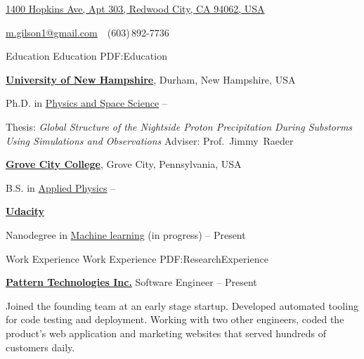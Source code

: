 \documentclass[letterpaper,MMMyyyy,nonstopmode]{simpleresumecv}
\newcommand{\CVAuthor}{Matthew Gilson, Ph.D}
\begin{document}

\Title{\CVAuthor}

\begin{SubTitle}
\href{https://www.google.com/maps/place/1400+Hopkins+Avenue,+Redwood+City,+California+994062,+USA}
{1400 Hopkins Ave, Apt 303, Redwood City, CA 94062, USA}
\par
\href{mailto:m.gilson1@gmail.com}
{m.gilson1@gmail.com}
\,\SubBulletSymbol\,
(603)\,892-7736
\end{SubTitle}

\begin{Body}


\Section
{Education}
{Education}
{PDF:Education}

\Entry
\href{http://www.unh.edu/}
{\textbf{University of New Hampshire}},
Durham, New Hampshire, USA

\Gap
\BulletItem
Ph.D. in
\href{http://physics.unh.edu/content/physics-phd}
{Physics and Space Science}
\hfill
{} --
\begin{Detail}
\SubBulletItem
Thesis: \textit{Global Structure of the Nightside Proton Precipitation During Substorms Using Simulations and Observations}
\SubBulletItem
Adviser:
Prof.~Jimmy~Raeder
\end{Detail}

\BigGap
\Entry
\href{http://www.gcc.edu/Pages/Grove-City-College.aspx}
{\textbf{Grove City College}},
Grove City, Pennsylvania, USA

\Gap
\BulletItem
B.S. in
\href{http://www.gcc.edu/academics/SEM/physics/Pages/default.aspx}
{Applied Physics}
\hfill
{} -- 

\BigGap
\Entry
\href{https://www.udacity.com}
{\textbf{Udacity}}

\Gap
\BulletItem
Nanodegree in
\href{https://www.udacity.com/course/machine-learning-engineer-nanodegree--nd009}
{Machine learning} (in progress)
\hfill
{} -- Present



\Section
{Work Experience}
{Work Experience}
{PDF:ResearchExperience}

\Entry
\href {https://getpattern.com}{\textbf{Pattern Technologies Inc.}}
\Gap
\BulletItem
Software Engineer
\hfill
{} -- Present
\begin{Detail}
\SubBulletItem
Joined the founding team at an early stage startup.  Developed automated tooling
for code testing and deployment.  Working with two other engineers, coded the product's web application and
marketing websites that served hundreds of customers daily.
\end{Detail}


\end{Body}
\end{document}

